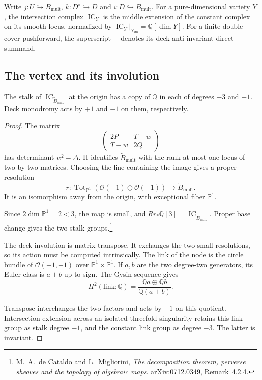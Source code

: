 Write $j:U\hookrightarrow B_{\mathrm{mult}}$, $k:D^\circ\hookrightarrow D$
and $i:D\hookrightarrow B_{\mathrm{mult}}$. For a pure-dimensional variety $Y$, the intersection
complex $\operatorname{IC}_Y$ is the middle extension of
the constant complex on its smooth locus, normalized by
$\operatorname{IC}_Y|_{Y_{\mathrm{sm}}}
=\mathbb Q[\dim Y]$.
For a finite double-cover pushforward, the superscript
$-$ denotes its deck anti-invariant direct summand.

\subsection{The vertex and its involution}

\begin{lemma}\label{vc:cqm:lem:node}
The stalk of $\operatorname{IC}_{\widetilde B_{\mathrm{mult}}}$ at the
origin has a copy of $\mathbb Q$ in each of degrees
$-3$ and $-1$. Deck monodromy acts by $+1$ and $-1$
on them, respectively.
\end{lemma}

\begin{proof}
The matrix
\[
 \begin{pmatrix}2P&T+w\\T-w&2Q\end{pmatrix}
\]
has determinant $w^2-\Delta$. It identifies $\widetilde B_{\mathrm{mult}}$
with the rank-at-most-one locus of two-by-two matrices.
Choosing the line containing the image gives a proper
resolution
\[
 r:\operatorname{Tot}_{\mathbb P^1}
       (\mathcal O(-1)\oplus\mathcal O(-1))
       \longrightarrow\widetilde B_{\mathrm{mult}}.
\]
It is an isomorphism away from the origin, with exceptional
fiber $\mathbb P^1$.

Since $2\dim\mathbb P^1=2<3$, the
map is small, and
$Rr_*\mathbb Q[3]=\operatorname{IC}_{\widetilde B_{\mathrm{mult}}}$.
Proper base change gives the two stalk groups.\footnote{
M.~A.~de Cataldo and L.~Migliorini,
\emph{The decomposition theorem, perverse sheaves and the
topology of algebraic maps}.
\href{https://arxiv.org/abs/0712.0349}{arXiv:0712.0349},
Remark~4.2.4.}

The deck involution is matrix transpose. It exchanges
the two small resolutions, so its action must be
computed intrinsically. The link of the node is the
circle bundle of $\mathcal O(-1,-1)$ over
$\mathbb P^1\times\mathbb P^1$. If $a,b$ are the two
degree-two generators, its Euler class is $a+b$ up to
sign. The Gysin sequence gives
\[
 H^2(\mathrm{link};\mathbb Q)
    =\frac{\mathbb Q a\oplus\mathbb Q b}
            {\mathbb Q(a+b)}.
\]

Transpose interchanges the two factors and acts by $-1$
on this quotient. Intersection extension across an
isolated threefold singularity retains this link group
as stalk degree $-1$, and the constant link group as
degree $-3$. The latter is invariant.
\end{proof}

